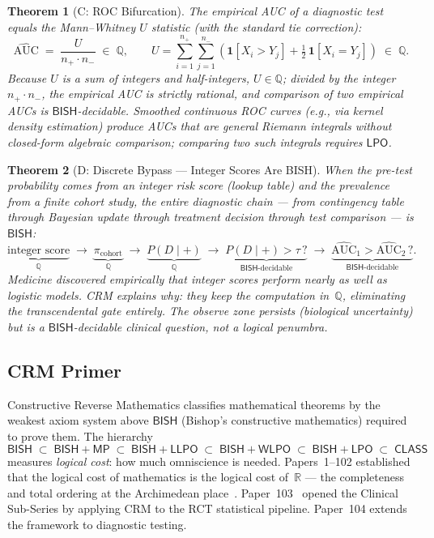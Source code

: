 \documentclass[11pt,a4paper]{article}
\theoremstyle{plain}
\newtheorem{theorem}{Theorem}[section]
\theoremstyle{definition}
\newcommand{\BISH}{\textsf{BISH}}
\newcommand{\WLPO}{\textsf{WLPO}}
\newcommand{\LLPO}{\textsf{LLPO}}
\newcommand{\LPO}{\textsf{LPO}}
\newcommand{\MP}{\textsf{MP}}
\newcommand{\CLASS}{\textsf{CLASS}}
\newcommand{\Q}{\mathbb{Q}}
\newcommand{\R}{\mathbb{R}}
\begin{document}
\begin{theorem}[C: ROC Bifurcation]\label{thm:C}
The empirical AUC of a diagnostic test equals the Mann--Whitney $U$ statistic (with the standard tie correction):
\[
  \widehat{\mathrm{AUC}} \;=\; \frac{U}{n_+ \cdot n_-} \;\in\; \Q, \qquad
  U = \sum_{i=1}^{n_+} \sum_{j=1}^{n_-} \left(\mathbf{1}[X_i > Y_j] + \tfrac{1}{2}\,\mathbf{1}[X_i = Y_j]\right) \;\in\; \Q.
\]
Because $U$ is a sum of integers and half-integers, $U \in \Q$; divided by the integer $n_+ \cdot n_-$, the empirical AUC is strictly rational, and comparison of two empirical AUCs is $\BISH$-decidable.  Smoothed continuous ROC curves (e.g., via kernel density estimation) produce AUCs that are general Riemann integrals without closed-form algebraic comparison; comparing two such integrals requires $\LPO$.
\end{theorem}

\begin{theorem}[D: Discrete Bypass --- Integer Scores Are BISH]\label{thm:D}
When the pre-test probability comes from an integer risk score (lookup table) and the prevalence from a finite cohort study, the \emph{entire} diagnostic chain --- from contingency table through Bayesian update through treatment decision through test comparison --- is $\BISH$:
\[
  \underbrace{\text{integer score}}_{\Q} \;\to\;
  \underbrace{\pi_{\mathrm{cohort}}}_{\Q} \;\to\;
  \underbrace{P(D\mid+)}_{\Q} \;\to\;
  \underbrace{P(D\mid+) > \tau\,?}_{\BISH\text{-decidable}} \;\to\;
  \underbrace{\widehat{\mathrm{AUC}}_1 > \widehat{\mathrm{AUC}}_2\,?}_{\BISH\text{-decidable}}.
\]
Medicine discovered empirically that integer scores perform nearly as well as logistic models.  CRM explains why: they keep the computation in~$\Q$, eliminating the transcendental gate entirely.  The observe zone persists (biological uncertainty) but is a $\BISH$-decidable clinical question, not a logical penumbra.
\end{theorem}

\subsection{CRM Primer}

Constructive Reverse Mathematics classifies mathematical theorems by the weakest axiom system above $\BISH$ (Bishop's constructive mathematics) required to prove them.  The hierarchy
\[
  \BISH \;\subset\; \BISH{+}\MP \;\subset\; \BISH{+}\LLPO \;\subset\; \BISH{+}\WLPO \;\subset\; \BISH{+}\LPO \;\subset\; \CLASS
\]
measures \emph{logical cost}: how much omniscience is needed.  Papers~1--102 established that the logical cost of mathematics is the logical cost of~$\R$ --- the completeness and total ordering at the Archimedean place~\cite{lee-crm-p98}.  Paper~103~\cite{lee-crm-p103} opened the Clinical Sub-Series by applying CRM to the RCT statistical pipeline.  Paper~104 extends the framework to diagnostic testing.
\end{document}

